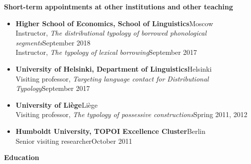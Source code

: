 \documentclass[letterpaper,11pt]{article}
\newcommand{\resheading}[1]{
\vspace*{6pt}
{\large \colorbox{mygrey}{\begin{minipage}{\textwidth}{\textbf{#1 \vphantom{p\^{E}}}}\end{minipage}}}
}
\begin{document}
\vspace{4pt}
\resheading{Short-term appointments at other institutions and other teaching} 
\begin{itemize}
\vspace{-0.025 in}
\vspace*{-2pt}
\item \textbf{Higher School of Economics, School of Linguistics}\hfill{Moscow}\\
{Instructor, \textit{The distributional typology of borrowed phonological segments}}\hfill{September 2018}\\
Instructor, \textit{The typology of lexical borrowing}\hfill{September 2017}
\item \textbf{University of Helsinki, Department of Linguistics}\hfill{Helsinki}\\{Visiting professor, \textit{Targeting language contact for Distributional Typology}}\hfill{September 2017}\\
\item \textbf{University of Li\`ege}\hfill{Li\`ege}\\{Visiting professor, \textit{The typology of possessive constructions}}\hfill{Spring 2011, 2012}\\
\item \textbf{{Humboldt University, TOPOI Excellence Cluster}}\hfill{Berlin}\\{Senior visiting researcher}\hfill{October 2011}
\end{itemize}
\newpage
\resheading{Education} 
\end{document}
